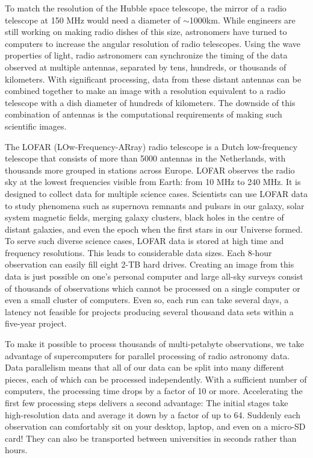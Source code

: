 To match the resolution of the Hubble space telescope, the mirror of a radio telescope at 150 MHz would need a diameter of $\sim$1000km. While engineers are still working on making radio dishes of this size, astronomers have turned to computers to increase the angular resolution of radio telescopes. Using the wave properties of light, radio astronomers can synchronize the timing of the data observed at multiple antennas, separated by tens, hundreds, or thousands of kilometers. With significant processing, data from these distant antennas can be combined together to make an image with a resolution equivalent to a radio telescope with a dish diameter of hundreds of kilometers. The downside of this combination of antennas is the computational requirements of making such scientific images.

The LOFAR (LOw-Frequency-ARray) radio telescope is a Dutch low-frequency telescope that consists of more than 5000 antennas in the Netherlands, with thousands more grouped in stations across Europe. LOFAR observes the radio sky at the lowest frequencies visible from Earth: from 10 MHz to 240 MHz. It is designed to collect data for multiple science cases. Scientists can use LOFAR data to study phenomena such as supernova remnants and pulsars in our galaxy, solar system magnetic fields, merging galaxy clusters, black holes in the centre of distant galaxies, and even the epoch when the first stars in our Universe formed. To serve such diverse science cases, LOFAR data is stored at high time and frequency resolutions. This leads to considerable data sizes. Each 8-hour observation can easily fill eight 2-TB hard drives. Creating an image from this data is just possible on one's personal computer and large all-sky surveys consist of thousands of observations which cannot be processed on a single computer or even a small cluster of computers. Even so, each run can take several days, a latency not feasible for projects producing several thousand data sets within a five-year project.

To make it possible to process thousands of multi-petabyte observations, we take advantage of supercomputers for parallel processing of radio astronomy data. Data parallelism means that all of our data can be split into many different pieces, each of which can be processed independently. With a sufficient number of computers, the processing time drops by a factor of 10 or more. Accelerating the first few processing steps delivers a second advantage: The initial stages take high-resolution data and average it down by a factor of up to 64. Suddenly each observation can comfortably sit on your desktop, laptop, and even on a micro-SD card! They can also be transported between universities in seconds rather than hours. 


